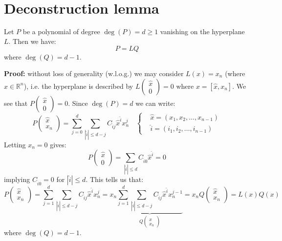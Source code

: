\section*{Deconstruction lemma}
Let $P$ be a polynomial of degree $\deg(P) = d \geq 1$ vanishing on the hyperplane $L$. Then we have:
\[
    P = L Q
\]
where $\deg(Q) = d - 1$.

\textbf{Proof:}
without loss of generality (w.l.o.g.) we may consider $L(x) = x_n$ (where $x \in \mathbb{R}^n$), i.e. the hyperplane is described by $L(\substack{\hat{x} \\ 0}) = 0$ where $x = [\hat{x}, x_n]$.
We see that $P(\substack{\hat{x} \\ 0}) = 0$. Since $\deg(P) = d$ we can write:
\[
    P(\substack{\hat{x} \\ x_n}) = \sum_{j=0}^d \sum_{|\hat{i}| \leq d - j} C_{\hat{i}j} \hat{x}^{\hat{i}} x_n^j \quad \begin{cases}
         & \hat{x} = (x_1, x_2, \ldots, x_{n-1}) \\
         & \hat{i} = (i_1, i_2, \ldots, i_{n-1})
    \end{cases}
\]
Letting $x_n = 0$ gives:
\[
    P(\substack{\hat{x} \\ 0}) = \sum_{|\hat{i}| \leq d} C_{\hat{i}0} \hat{x}^{\hat{i}} = 0
\]
implying $C_{\hat{i}0} = 0$ for $|\hat{i}| \leq d$. This tells us that:
\[
    P(\substack{\hat{x} \\ x_n}) = \sum_{j=1}^d \sum_{|\hat{i}| \leq d - j} C_{\hat{i}j} \hat{x}^{\hat{i}} x_n^j = x_n \underbrace{\sum_{j=1}^d \sum_{|\hat{i}| \leq d - j} C_{\hat{i}j} \hat{x}^{\hat{i}} x_n^{j-1}}_{Q(\substack{\hat{x} \\ x_n})} = x_n Q(\substack{\hat{x} \\ x_n}) = L(x) Q(x)
\]
where $\deg(Q) = d - 1$.
